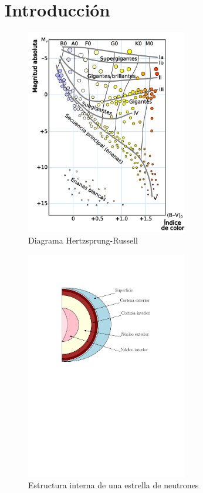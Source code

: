 \chapter{Introducción}



\begin{figure}[H]
    \centering
    \includegraphics[width=200pt]{figures/H-R_diagram.pdf}
    \caption{Diagrama Hertzsprung-Russell}
    \label{HR}
\end{figure}

\begin{figure}[H]
    \centering
    \includegraphics[width=200pt]{figures/neutronstar.pdf}
    \caption{Estructura interna de una estrella de neutrones}
    \label{NSS}
\end{figure}